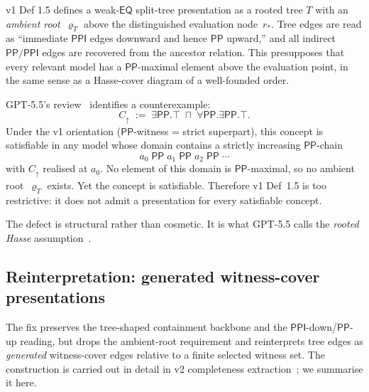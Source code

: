 \documentclass[11pt]{article}
\theoremstyle{definition}
\theoremstyle{remark}
\newcommand{\PP}{\mathsf{PP}}
\newcommand{\PPI}{\mathsf{PPI}}
\newcommand{\EQ}{\mathsf{EQ}}
\begin{document}
v1 Def 1.5 defines a weak-$\EQ$ split-tree presentation as a
rooted tree $T$ with an \emph{ambient root}~$\varrho_T$ above the
distinguished evaluation node~$r_\ast$. Tree edges are read as
``immediate $\PPI$ edges downward and hence $\PP$ upward,'' and
all indirect $\PP/\PPI$ edges are recovered from the ancestor
relation. This presupposes that every relevant model has a
$\PP$-maximal element above the evaluation point, in the same
sense as a Hasse-cover diagram of a well-founded order.

GPT-5.5's review~\cite{GPT55Review} identifies a counterexample:
\[
  C_\uparrow \;:=\;
  \exists\PP.\top \;\sqcap\; \forall\PP.\exists\PP.\top.
\]
Under the v1 orientation ($\PP$-witness = strict superpart), this
concept is satisfiable in any model whose domain contains a
strictly increasing $\PP$-chain
\[
  a_0 \;\PP\; a_1 \;\PP\; a_2 \;\PP\; \cdots
\]
with $C_\uparrow$ realised at $a_0$. No element of this domain is
$\PP$-maximal, so no ambient root~$\varrho_T$ exists. Yet the
concept is satisfiable. Therefore v1 Def~1.5 is too restrictive:
it does not admit a presentation for every satisfiable concept.

The defect is structural rather than cosmetic. It is what GPT-5.5
calls the \emph{rooted Hasse} assumption~\cite{GPT55Review,
GPT55Survival}.

\subsection{Reinterpretation: generated witness-cover presentations}

The fix preserves the tree-shaped containment backbone and the
$\PPI$-down/$\PP$-up reading, but drops the ambient-root
requirement and reinterprets tree edges as \emph{generated}
witness-cover edges relative to a finite selected witness set.
The construction is carried out in detail in v2 completeness
extraction~\cite[\S 4--\S 5]{CompletenessV2}; we summarise it here.
\end{document}
